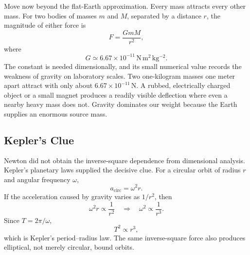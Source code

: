 Move now beyond the flat-Earth approximation. Every mass attracts every
other mass. For two bodies of masses \(m\) and \(M\), separated by a distance
\(r\), the magnitude of either force is
\begin{equation}
  F=\frac{GmM}{r^2},
  \label{eq:l01-scalar-gravity}
\end{equation}
where
\begin{equation}
  G\simeq 6.67\times10^{-11}\,
  \mathrm{N\,m^2\,kg^{-2}}.
  \label{eq:l01-G}
\end{equation}
The constant is needed dimensionally, and its small numerical value records
the weakness of gravity on laboratory scales. Two one-kilogram masses one
meter apart attract with only about
\(6.67\times10^{-11}\,\mathrm N\). A rubbed, electrically charged object or
a small magnet produces a readily visible deflection where even a nearby
heavy mass does not. Gravity dominates our weight because the Earth supplies
an enormous source mass.

\begin{classroomqa}
\end{classroomqa}

\subsection{Kepler's Clue}

Newton did not obtain the inverse-square dependence from dimensional
analysis. Kepler's planetary laws supplied the decisive clue. For a circular
orbit of radius \(r\) and angular frequency \(\omega\),
\begin{equation}
  a_{\mathrm{circ}}=\omega^2r.
  \label{eq:l01-centripetal}
\end{equation}
If the acceleration caused by gravity varies as \(1/r^2\), then
\begin{equation}
  \omega^2r\propto\frac1{r^2}
  \quad\Longrightarrow\quad
  \omega^2\propto\frac1{r^3}.
\end{equation}
Since \(T=2\pi/\omega\),
\begin{equation}
  \boxed{T^2\propto r^3,}
  \label{eq:l01-kepler-third}
\end{equation}
which is Kepler's period--radius law. The same inverse-square force also
produces elliptical, not merely circular, bound orbits.

